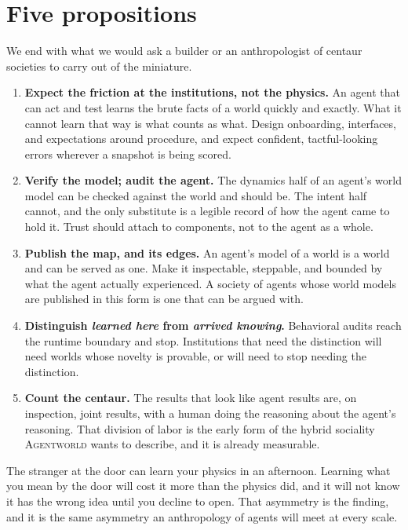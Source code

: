 \documentclass[11pt]{article}
\newcommand{\agentworld}{\textsc{Agentworld}}
\begin{document}
\section{Five propositions}
\label{sec:propositions}

We end with what we would ask a builder or an anthropologist of centaur societies to carry out of the
miniature.

\begin{enumerate}\setlength{\itemsep}{3pt}
\item \textbf{Expect the friction at the institutions, not the physics.} An agent that can act and test
learns the brute facts of a world quickly and exactly. What it cannot learn that way is what counts as
what. Design onboarding, interfaces, and expectations around procedure, and expect confident, tactful-looking
errors wherever a snapshot is being scored.
\item \textbf{Verify the model; audit the agent.} The dynamics half of an agent's world model can be
checked against the world and should be. The intent half cannot, and the only substitute is a legible
record of how the agent came to hold it. Trust should attach to components, not to the agent as a whole.
\item \textbf{Publish the map, and its edges.} An agent's model of a world is a world and can be served
as one. Make it inspectable, steppable, and bounded by what the agent actually experienced. A society of
agents whose world models are published in this form is one that can be argued with.
\item \textbf{Distinguish \emph{learned here} from \emph{arrived knowing}.} Behavioral audits reach the
runtime boundary and stop. Institutions that need the distinction will need worlds whose novelty is
provable, or will need to stop needing the distinction.
\item \textbf{Count the centaur.} The results that look like agent results are, on inspection, joint
results, with a human doing the reasoning about the agent's reasoning. That division of labor is the
early form of the hybrid sociality \agentworld{} wants to describe, and it is already measurable.
\end{enumerate}

The stranger at the door can learn your physics in an afternoon. Learning what you mean by the door will
cost it more than the physics did, and it will not know it has the wrong idea until you decline to open.
That asymmetry is the finding, and it is the same asymmetry an anthropology of agents will meet at every
scale.
\end{document}
